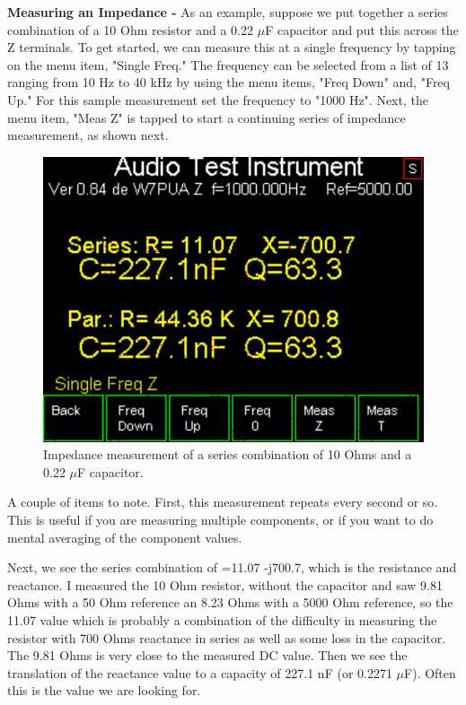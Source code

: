 \textbf{Measuring an Impedance - }As an example, suppose we put together a series combination of a 10 Ohm resistor and a 0.22 $\mu$F capacitor and put this across the Z terminals. To get started, we can measure this at a single frequency by tapping on the menu item, "Single Freq." The frequency can be selected from a list of 13 ranging from 10 Hz to 40 kHz by using the menu items, "Freq Down" and, "Freq Up."  For this sample measurement set the frequency to "1000 Hz".  Next, the menu item, "Meas Z" is tapped to start a continuing series of impedance measurement, as shown next.
\begin{figure}[H]
\begin{center}
\includegraphics[scale=0.75]{./images/AVNA_006.pdf}
\caption{Impedance measurement of a series combination of 10 Ohms and a 0.22 $\mu$F capacitor.}
\label{AVNA_006-label}
\end{center}
\end{figure}
A couple of items to note.  First, this measurement repeats every second or so.
This is useful if you are measuring multiple components, or if you want to do mental averaging of the component values.

Next, we see the series combination of  =11.07 -j700.7, which is the resistance and reactance. I measured the 10 Ohm resistor, without the capacitor and saw 9.81 Ohms with a 50 Ohm reference an 8.23 Ohms with a 5000 Ohm reference, so the 11.07 value which is probably a combination of the difficulty in measuring the resistor with 700 Ohms reactance in series as well as some loss in the capacitor.  The 9.81 Ohms is very close to the measured DC value. Then we see the translation of the reactance value to a capacity of 227.1 nF (or 0.2271 $\mu$F).  Often this is the value we are looking for.

